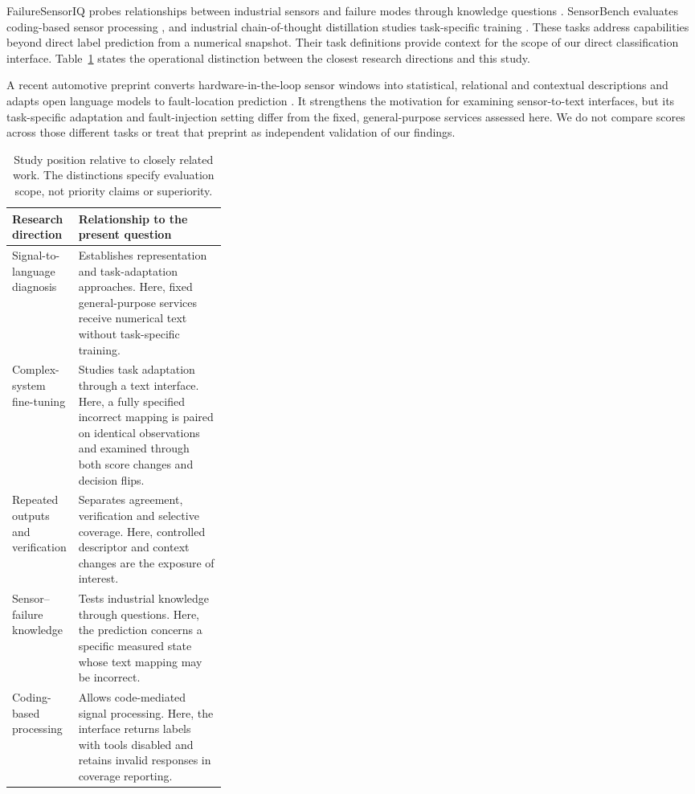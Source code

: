 \documentclass[11pt,a4paper]{article}
\begin{document}
FailureSensorIQ probes relationships between industrial sensors and failure modes through knowledge questions \citep{constantinides2025failuresensoriq}. SensorBench evaluates coding-based sensor processing \citep{sensorbench2025}, and industrial chain-of-thought distillation studies task-specific training \citep{lin2025finetuned}. These tasks address capabilities beyond direct label prediction from a numerical snapshot. Their task definitions provide context for the scope of our direct classification interface. Table~\ref{tab:position} states the operational distinction between the closest research directions and this study.

A recent automotive preprint converts hardware-in-the-loop sensor windows into statistical, relational and contextual descriptions and adapts open language models to fault-location prediction \citep{abboush2026sensor}. It strengthens the motivation for examining sensor-to-text interfaces, but its task-specific adaptation and fault-injection setting differ from the fixed, general-purpose services assessed here. We do not compare scores across those different tasks or treat that preprint as independent validation of our findings.

\begin{table}[htbp]
\centering\small
\caption{Study position relative to closely related work. The distinctions specify evaluation scope, not priority claims or superiority.}
\label{tab:position}
\begin{tabularx}{\linewidth}{@{}>{\raggedright\arraybackslash}p{0.31\linewidth}>{\raggedright\arraybackslash}X@{}}
\toprule
Research direction & Relationship to the present question \\
\midrule
Signal-to-language diagnosis \citep{qaid2026explainable} & Establishes representation and task-adaptation approaches. Here, fixed general-purpose services receive numerical text without task-specific training. \\
Complex-system fine-tuning \citep{zheng2024empirical} & Studies task adaptation through a text interface. Here, a fully specified incorrect mapping is paired on identical observations and examined through both score changes and decision flips. \\
Repeated outputs and verification \citep{kiangala2026verification} & Separates agreement, verification and selective coverage. Here, controlled descriptor and context changes are the exposure of interest. \\
Sensor--failure knowledge \citep{constantinides2025failuresensoriq} & Tests industrial knowledge through questions. Here, the prediction concerns a specific measured state whose text mapping may be incorrect. \\
Coding-based processing \citep{sensorbench2025} & Allows code-mediated signal processing. Here, the interface returns labels with tools disabled and retains invalid responses in coverage reporting. \\
\bottomrule
\end{tabularx}
\end{table}
\end{document}
